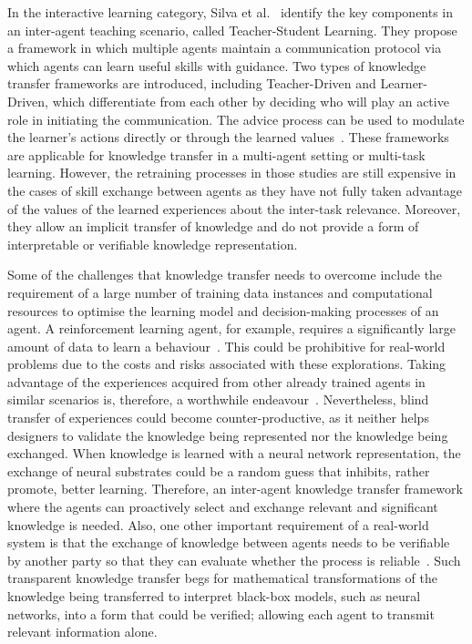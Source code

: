 \documentclass[lettersize,journal]{IEEEtran}
\begin{document}
In the interactive learning category, Silva et al.~\cite{da2020agents} identify the key components in an inter-agent teaching scenario, called Teacher-Student Learning. They propose a framework in which multiple agents maintain a communication protocol via which agents can learn useful skills with guidance. Two types of knowledge transfer frameworks are introduced, including Teacher-Driven and Learner-Driven, which differentiate from each other by deciding who will play an active role in initiating the communication. The advice process can be used to modulate the learner\textquoteright s actions directly or through the learned values~\cite{cruz2016training}. These frameworks are applicable for knowledge transfer in a multi-agent setting or multi-task learning. However, the retraining processes in those studies are still expensive in the cases of skill exchange between agents as they have not fully taken advantage of the values of the learned experiences about the inter-task relevance. Moreover, they allow an implicit transfer of knowledge and do not provide a form of interpretable or verifiable knowledge representation.

Some of the challenges that knowledge transfer needs to overcome include the requirement of a large number of training data instances and computational resources to optimise the learning model and decision-making processes of an agent. A reinforcement learning agent, for example, requires a significantly large amount of data to learn a behaviour~\cite{yu2018towards}. This could be prohibitive for real-world problems due to the costs and risks associated with these explorations. Taking advantage of the experiences acquired from other already trained agents in similar scenarios is, therefore, a worthwhile endeavour~\cite{da2020agents}. Nevertheless, blind transfer of experiences could become counter-productive, as it neither helps designers to validate the knowledge being represented nor the knowledge being exchanged. When knowledge is learned with a neural network representation, the exchange of neural substrates could be a random guess that inhibits, rather promote, better learning. Therefore, an inter-agent knowledge transfer framework where the agents can proactively select and exchange relevant and significant knowledge is needed. Also, one other important requirement of a real-world system is that the exchange of knowledge between agents needs to be verifiable by another party so that they can evaluate whether the process is reliable~\cite{he2021challenges}. Such transparent knowledge transfer begs for mathematical transformations of the knowledge being transferred to interpret black-box models, such as neural networks, into a form that could be verified; allowing each agent to transmit relevant information alone.
\end{document}
